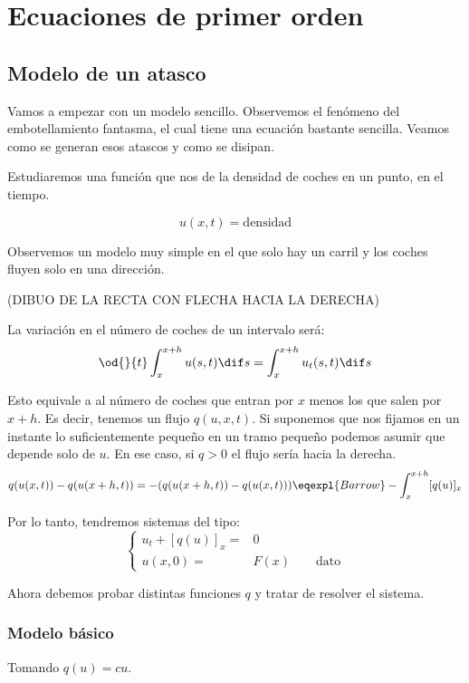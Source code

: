 \chapter{Ecuaciones de primer orden}

\section{Modelo de un atasco}

	Vamos a empezar con un modelo sencillo. Observemos el fenómeno del embotellamiento fantasma, el cual tiene una ecuación bastante sencilla. Veamos como se generan esos atascos y como se disipan.

	Estudiaremos una función que nos de la densidad de coches en un punto, en el tiempo.

	$$u(x,t) = \text{densidad}$$

	Observemos un modelo muy simple en el que solo hay un carril y los coches fluyen solo en una dirección.

	(DIBUO DE LA RECTA CON FLECHA HACIA LA DERECHA)

	La variación en el número de coches de un intervalo será:
	\[ \od{}{t} \int^{x+h}_{x} u(s,t) \dif s = \int^{x+h}_{x} u_t(s,t) \dif s \]

	Esto equivale a al número de coches que entran por $x$ menos los que salen por $x + h$. Es decir, tenemos un flujo $q(u, x, t)$. Si suponemos que nos fijamos en un instante lo suficientemente pequeño en un tramo pequeño podemos asumir que depende solo de $u$. En ese caso, si $q > 0$ el flujo sería hacia la derecha.
	\[ q(u(x,t)) - q(u(x+h,t)) = -( q(u(x+h,t)) -  q(u(x,t)) ) \eqexpl{Barrow} -\int^{x+h}_{x} [q(u)]_{x}
	\]

	Por lo tanto, tendremos sistemas del tipo:
	\begin{equation*}
	\left\{
	\begin{array}{rl}
	u_t + [q(u)]_{x} =&\! 0 \\
	u(x, 0) =&\! F(x) \quad \quad \text{dato}
	\end{array}
	\right.
	\end{equation*}

	Ahora debemos probar distintas funciones $q$ y tratar de resolver el sistema.

	\subsection{Modelo básico}

		Tomando $q(u) = cu$.

